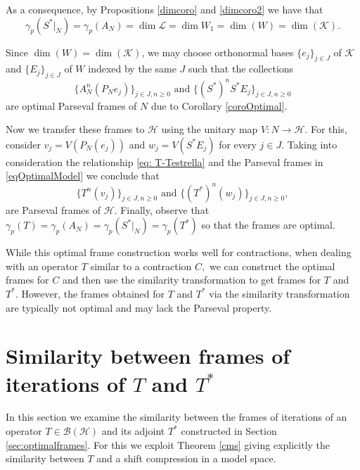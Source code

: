 \documentclass[a4paper,12pt]{amsart}
\def\cB{{\mathcal{B}}}
\def\HH{{\mathcal{H}}}
\def\KK{{\mathcal{K}}}
\def\LL{{\mathcal{L}}}
\theoremstyle{definition}
\begin{document}
As a consequence, by Propositions \ref{dimcoro} and \ref{dimcoro2} we have that
\begin{equation*}
\gamma_p(S^*|_N)=\gamma_p(A_N)=\dim\LL=\dim W_1=\dim(W)=\dim(\KK).
\end{equation*}

Since $\dim(W)=\dim(\KK)$, we may choose orthonormal bases  $\{e_j\}_{j\in J}$  of $\KK$ and $\{E_j\}_{j\in J}$  of $W$ indexed by the same $J$ such that the collections
\begin{equation}\label{eqOptimalModel}
\{A_N^n(P_Ne_j)\}_{j\in J,n\geqslant 0}\text{ and }\{(S^*)^n S^*E_j\}_{j\in J,n\geqslant 0} 
\end{equation}
are optimal Parseval frames of $N$ due to Corollary \ref{coroOptimal}.

Now we transfer these frames to $\HH$ using the unitary map $V:N\to\HH$. For this, consider $v_j=V(P_N(e_j))$ and $w_j = V(S^*E_j)$ 
for every $j\in J$. Taking into consideration the relationship \eqref{eq: T-Testrella} and the Parseval frames in \eqref{eqOptimalModel} we conclude that
\begin{equation*}
\{T^n(v_j)\}_{j\in J,n\geqslant 0}\text{ and }\{(T^*)^n (w_j)\}_{j\in J,n\geqslant 0},
\end{equation*}
are Parseval frames of $\HH$.  Finally, observe that $\gamma_p(T)=\gamma_p(A_N)=\gamma_p(S^*|_N)=\gamma_p(T^*)$ so that the frames are optimal. 

While this optimal frame construction works well for contractions, when dealing with an operator $T$ similar to a contraction $C,$ we can construct the optimal frames for $C$ and then use the similarity transformation to get frames for $T$ and $T^*.$
However, the frames obtained for $T$ and $T^*$ 
 via the similarity transformation are typically not optimal and may lack the Parseval property.





\section{Similarity between frames of iterations of \texorpdfstring{$T$ and $T^*$}{T and T*}}\label{estructura}

In this section we examine the similarity between the frames of iterations of an operator $T\in\cB(\HH)$ and its adjoint $T^*$ constructed in Section \ref{sec:optimalframes}. For this we exploit Theorem \ref{cms} giving explicitly the similarity between $T$ and a shift compression in a model space. 
\end{document}

